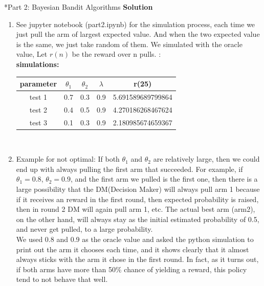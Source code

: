 \documentclass{article}
\newcommand{\solution}{\textbf{\Large Solution}}
\begin{document}
\begin{homeworkProblem}*{Part 2: Bayesian Bandit Algorithms}
    \solution
    \begin{enumerate}[1.]
        \item
        See jupyter notebook (part2.ipynb) for the simulation process, each time we just pull the arm of largest expected value. And when the two expected value is the same, we just take random of them. We simulated with the oracle value, Let $r(n)$ be the reward over n pulls. :\\
        \textbf{simulations:}\\
        \begin{tabular}[t]{|c|c|c|c|c|}
        \hline
        parameter & $\theta_1$ & $\theta_2$ & $\lambda$ & r(25) \\
        \hline
        test 1 & 0.7 & 0.3 & 0.9 & 5.691589689799864 \\
        \hline
        test 2 & 0.4 & 0.5 & 0.9 & 4.270186268467624 \\
        \hline
        test 3 & 0.1 & 0.3 & 0.9 & 2.180985674659367 \\
        \hline
        \end{tabular}\\
        \item
        Example for not optimal: If both $\theta_1$ and $\theta_2$ are relatively large, then we could end up with always pulling the first arm that succeeded.
        For example, if $\theta_1 = 0.8$, $\theta_2 = 0.9$, and the first arm we pulled is the first one, then there is a large possibility that the DM(Decision Maker) will always pull arm 1 because if it receives an reward in the first round, then expected probability is raised, then in round 2 DM will again pull arm 1, etc. The actual best arm (arm2), on the other hand, will always stay as the initial estimated probability of 0.5, and never get pulled, to a large probability.\\
        We used 0.8 and 0.9 as the oracle value and asked the python simulation to print out the arm it chooses each time, and it shows clearly that it almost always sticks with the arm it chose in the first round.
        In fact, as it turns out, if both arms have more than 50\% chance of yielding a reward, this policy tend to not behave that well.


\end{enumerate}
\end{homeworkProblem}
\end{document}

